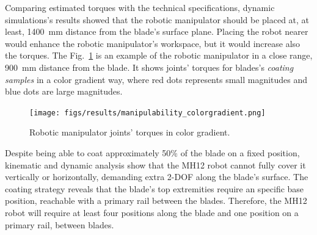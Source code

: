 \begin{figure}
	\centering
	\quad
\end{figure}

Comparing estimated torques with the technical
specifications, dynamic simulations's results showed that the robotic
manipulator should be placed at, at least, 1400~mm distance from the blade's
surface plane. Placing the robot nearer would enhance the robotic manipulator's
workspace, but it would increase also the torques. The Fig.~\ref{fig:torques}
is an example of the robotic manipulator in a close range, 900~mm distance from the
blade. It shows joints' torques for blades's \textit{coating samples} in a color
gradient way, where red dots represents small magnitudes and blue dots are large magnitudes. 

\begin{figure}
	\centering
	\texttt{[image: figs/results/manipulability\_colorgradient.png]}
    \caption{Robotic manipulator joints' torques in color gradient.}
    \label{fig:torques}
\end{figure}

Despite being able to coat approximately 50\% of the blade on a fixed
position, kinematic and dynamic analysis show that the MH12 robot cannot fully
cover it vertically or horizontally, demanding extra 2-DOF along the blade's
surface. The coating strategy reveals that the blade's top
extremities require an specific base position, reachable
with a primary rail between the blades. Therefore, the MH12 robot will require
at least four positions along the blade and one position on a primary
rail, between blades. 

